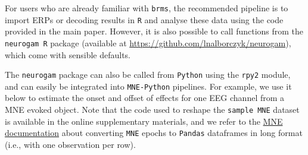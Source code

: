 \documentclass[
  doc,
  floatsintext,
  longtable,
  a4paper,
  nolmodern,
  notxfonts,
  notimes,
  donotrepeattitle,
  colorlinks=true,linkcolor=blue,citecolor=blue,urlcolor=blue]{apa7}
\newenvironment{Shaded}{\begin{snugshade}}{\end{snugshade}}
\newcommand{\AttributeTok}[1]{\textcolor[rgb]{0.40,0.45,0.13}{#1}}
\newcommand{\CommentTok}[1]{\textcolor[rgb]{0.37,0.37,0.37}{#1}}
\newcommand{\DecValTok}[1]{\textcolor[rgb]{0.68,0.00,0.00}{#1}}
\newcommand{\FunctionTok}[1]{\textcolor[rgb]{0.28,0.35,0.67}{#1}}
\newcommand{\NormalTok}[1]{\textcolor[rgb]{0.00,0.23,0.31}{#1}}
\newcommand{\OtherTok}[1]{\textcolor[rgb]{0.00,0.23,0.31}{#1}}
\newcommand{\SpecialCharTok}[1]{\textcolor[rgb]{0.37,0.37,0.37}{#1}}
\newcommand{\StringTok}[1]{\textcolor[rgb]{0.13,0.47,0.30}{#1}}
\begin{document}
For users who are already familiar with \texttt{brms}, the recommended
pipeline is to import ERPs or decoding results in \texttt{R} and analyse
these data using the code provided in the main paper. However, it is
also possible to call functions from the \texttt{neurogam\ R} package
(available at \url{https://github.com/lnalborczyk/neurogam}), which come
with sensible defaults.

\begin{Shaded}
\end{Shaded}

The \texttt{neurogam} package can also be called from \texttt{Python}
using the \texttt{rpy2} module, and can easily be integrated into
\texttt{MNE-Python} pipelines. For example, we use it below to estimate
the onset and offset of effects for one EEG channel from a MNE evoked
object. Note that the code used to reshape the \texttt{sample\ MNE}
dataset is available in the online supplementary materials, and we refer
to the
\href{https://mne.tools/stable/auto_tutorials/epochs/50_epochs_to_data_frame.html}{MNE
documentation} about converting \texttt{MNE} epochs to \texttt{Pandas}
dataframes in long format (i.e., with one observation per row).
\end{document}
